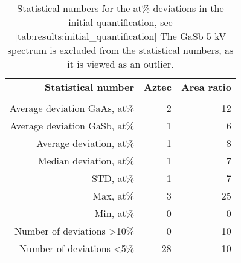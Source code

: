 \begin{table}[phtb]
    \begin{center}
        \caption{
            Statistical numbers for the at\% deviations in the initial quantification, see \cref{tab:results:initial_quantification}
            The GaSb 5 kV spectrum is excluded from the statistical numbers, as it is viewed as an outlier.
        }
        \label{tab:results:initial_quantification_stats}
        \begin{tabular}{rrr}
            \hline
            \textbf{Statistical number}  & \textbf{Aztec} & \textbf{Area ratio} \\
            \emph{}                      & \emph{}        & \emph{}             \\
            \hline
            Average deviation GaAs, at\% & 2              & 12                  \\
            Average deviation GaSb, at\% & 1              & 6                   \\
            Average deviation, at\%      & 1              & 8                   \\
            Median deviation, at\%       & 1              & 7                   \\
            STD, at\%                    & 1              & 7                   \\
            Max, at\%                    & 3              & 25                  \\
            Min, at\%                    & 0              & 0                   \\
            Number of deviations >10\%   & 0              & 10                  \\
            Number of deviations  <5\%   & 28             & 10                  \\
            \hline
        \end{tabular}
    \end{center}
\end{table}
